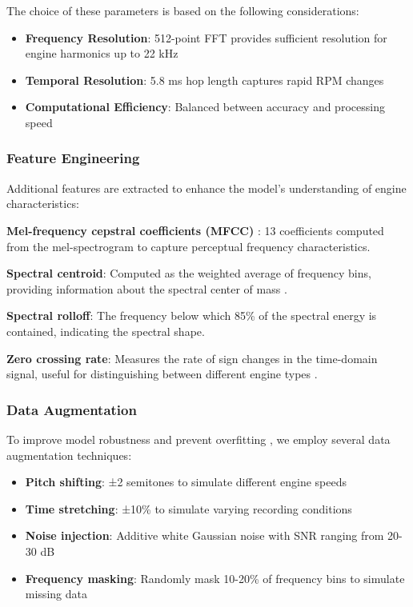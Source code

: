 \documentclass[journal,10pt]{IEEEtran}
\begin{document}
The choice of these parameters is based on the following considerations:
\begin{itemize}
    \item \textbf{Frequency Resolution}: 512-point FFT provides sufficient resolution for engine harmonics up to 22 kHz
    \item \textbf{Temporal Resolution}: 5.8 ms hop length captures rapid RPM changes
    \item \textbf{Computational Efficiency}: Balanced between accuracy and processing speed
\end{itemize}

\subsubsection{Feature Engineering}

Additional features are extracted to enhance the model's understanding of engine characteristics:

\textbf{Mel-frequency cepstral coefficients (MFCC)} \cite{DFFT}: 13 coefficients computed from the mel-spectrogram to capture perceptual frequency characteristics.

\textbf{Spectral centroid}: Computed as the weighted average of frequency bins, providing information about the spectral center of mass \cite{RFFT}.

\textbf{Spectral rolloff}: The frequency below which 85\% of the spectral energy is contained, indicating the spectral shape.

\textbf{Zero crossing rate}: Measures the rate of sign changes in the time-domain signal, useful for distinguishing between different engine types \cite{biotech}.

\subsubsection{Data Augmentation}

To improve model robustness and prevent overfitting \cite{GANA}, we employ several data augmentation techniques:

\begin{itemize}
    \item \textbf{Pitch shifting}: ±2 semitones to simulate different engine speeds
    \item \textbf{Time stretching}: ±10\% to simulate varying recording conditions
    \item \textbf{Noise injection}: Additive white Gaussian noise with SNR ranging from 20-30 dB
    \item \textbf{Frequency masking}: Randomly mask 10-20\% of frequency bins to simulate missing data
\end{itemize}
\end{document}
